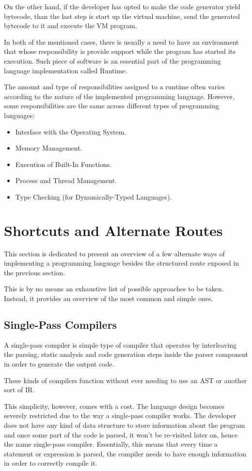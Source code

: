 On the other hand, if the developer has opted to make the code generator yield bytecode, than the last step is start up the virtual machine, send the generated bytecode to it and execute the VM program.

In both of the mentioned cases, there is usually a need to have an environment that whose responsibility is provide support while the program has started its execution. Such piece of software is an essential part of the programming language implementation called Runtime.

The amount and type of responsibilities assigned to a runtime often varies according to the nature of the implemented programming language. However, some responsibilities are the same across different types of 
programming languages:

\begin{itemize}
    \item Interface with the Operating System.
    \item Memory Management.
    \item Execution of Built-In Functions.
    \item Process and Thread Management.
    \item Type Checking (for Dynamically-Typed Languages).
\end{itemize}


\section{Shortcuts and Alternate Routes}
This section is dedicated to present an overview of a few alternate ways of implementing a programming language besides the structured route exposed in the previous section. 

This is by no means an exhaustive list of possible approaches to be taken. Instead, it provides an overview of the most common and simple ones.

\subsection{Single-Pass Compilers}
A single-pass compiler is simple type of compiler that operates by interleaving the parsing, static analysis and code generation steps inside the parser component in order to generate the output code.

These kinds of compilers function without ever needing to use an AST or another sort of IR.

This simplicity, however, comes with a cost. The language design becomes severely restricted due to the way a single-pass compiler works. The developer does not have any kind of data structure to store information about the program and once some part of the code is parsed, it won't be re-visited later on, hence the name single-pass compiler. Essentially, this means that every time a statement or expression is parsed, the compiler needs to have enough information in order to correctly compile it.

